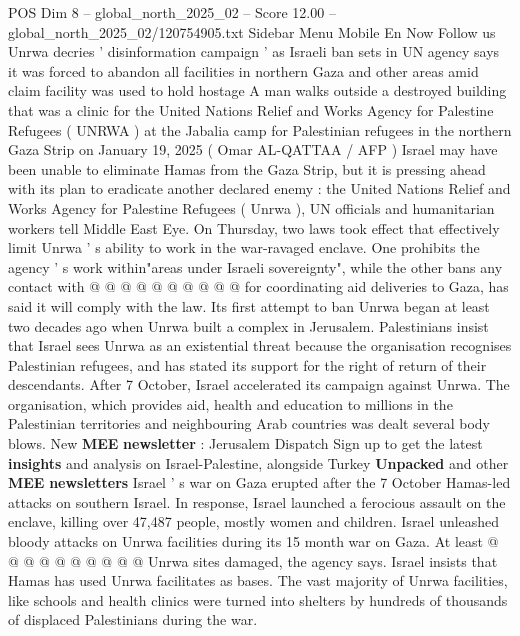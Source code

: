 \begin{textsample}{POS Dim 8 – global\_north\_2025\_02 – Score 12.00 – global\_north\_2025\_02/120754905.txt}  \label{ex:f8_pos_020}
Sidebar Menu Mobile En Now Follow us Unrwa decries ' disinformation campaign ' as Israeli ban sets in UN agency says it was forced to abandon all facilities in northern Gaza and other areas amid claim facility was used to hold hostage A man walks outside a destroyed building that was a clinic for the United Nations Relief and Works Agency for Palestine Refugees ( UNRWA ) at the Jabalia camp for Palestinian refugees in the northern Gaza Strip on January 19, 2025 ( Omar AL-QATTAA / AFP ) Israel may have been unable to eliminate Hamas from the Gaza Strip, but it is pressing ahead with its plan to eradicate another declared enemy : the United Nations Relief and Works Agency for Palestine Refugees ( Unrwa ), UN officials and humanitarian workers tell Middle East Eye.
On Thursday, two laws took effect that effectively limit Unrwa ' s ability to work in the war-ravaged enclave.
One prohibits the agency ' s work within"areas under Israeli sovereignty", while the other bans any contact with @ @ @ @ @ @ @ @ @ @ for coordinating aid deliveries to Gaza, has said it will comply with the law.
Its first attempt to ban Unrwa began at least two decades ago when Unrwa built a complex in Jerusalem.
Palestinians insist that Israel sees Unrwa as an existential threat because the organisation recognises Palestinian refugees, and has stated its support for the right of return of their descendants.
After 7 October, Israel accelerated its campaign against Unrwa.
The organisation, which provides aid, health and education to millions in the Palestinian territories and neighbouring Arab countries was dealt several body blows.
New \textbf{MEE} \textbf{newsletter} : Jerusalem Dispatch Sign up to get the latest \textbf{insights} and analysis on Israel-Palestine, alongside Turkey \textbf{Unpacked} and other \textbf{MEE} \textbf{newsletters} Israel ' s war on Gaza erupted after the 7 October Hamas-led attacks on southern Israel.
In response, Israel launched a ferocious assault on the enclave, killing over 47,487 people, mostly women and children.
Israel unleashed bloody attacks on Unrwa facilities during its 15 month war on Gaza.
At least @ @ @ @ @ @ @ @ @ @ Unrwa sites damaged, the agency says.
Israel insists that Hamas has used Unrwa facilitates as bases.
The vast majority of Unrwa facilities, like schools and health clinics were turned into shelters by hundreds of thousands of displaced Palestinians during the war.

\end{textsample}
